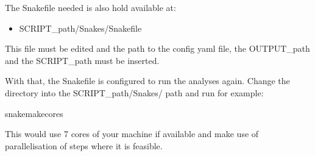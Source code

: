 \documentclass[letterpaper,10pt,english]{sphinxmanual}
\begin{document}
\sphinxAtStartPar
The Snakefile needed is also hold available at:
\begin{itemize}
\item {} 
\sphinxAtStartPar
SCRIPT\_path/Snakes/Snakefile

\end{itemize}

\sphinxAtStartPar
This file must be edited and the path to the config yaml file, the OUTPUT\_path
and the SCRIPT\_path must be inserted.

\sphinxAtStartPar
With that, the Snakefile is configured to run the analyses again. Change the
directory into the SCRIPT\_path/Snakes/ path and run for example:

\begin{sphinxVerbatim}[commandchars=\\\{\}]
\PYGZdl{}snakemake\PYGZhy{}\PYGZhy{}cores
\end{sphinxVerbatim}

\sphinxAtStartPar
This would use 7 cores of your machine if available and make use of
parallelisation of steps where it is feasible.



\renewcommand{\indexname}{Index}
\printindex
\end{document}

